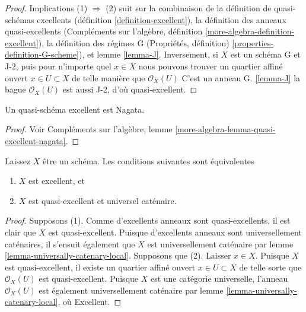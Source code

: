 \begin{proof}

Implications (1) $\Rightarrow$ (2) suit sur la combinaison de la définition de quasi-schémas excellents (définition \ref{definition-excellent}), la définition des anneaux quasi-excellents (Compléments sur l'algèbre, définition \ref{more-algebra-definition-excellent}), la définition des régimes G (Propriétés, définition) \ref{properties-definition-G-scheme}), et lemme \ref{lemma-J}. Inversement, si $X$ est un schéma G et J-2, puis pour n'importe quel $x \in X$
nous pouvons trouver un quartier affiné ouvert $x \in U \subset X$
de telle manière que $\mathcal{O}_X(U)$ C'est un anneau G. \ref{lemma-J}
la bague $\mathcal{O}_X(U)$ est aussi J-2, d'où quasi-excellent.

\end{proof}

\begin{lemma}

\label{lemma-quasi-excellent-nagata}
Un quasi-schéma excellent est Nagata.
\end{lemma}

\begin{proof}
Voir Compléments sur l'algèbre, lemme \ref{more-algebra-lemma-quasi-excellent-nagata}.
\end{proof}

\begin{lemma}

\label{lemma-characterize-excellent}
Laissez $X$ être un schéma. Les conditions suivantes sont équivalentes
\begin{enumerate}
\item $X$ est excellent, et
\item $X$ est quasi-excellent et universel caténaire.
\end{enumerate}

\end{lemma}

\begin{proof}
Supposons (1). Comme d'excellents anneaux sont quasi-excellents, il est clair que $X$ est quasi-excellent. Puisque d'excellents anneaux sont universellement caténaires, il s'ensuit également que $X$ est universellement caténaire par lemme \ref{lemma-universally-catenary-local}. Supposons que (2). Laisser $x \in X$. Puisque $X$ est quasi-excellent, il existe un quartier affiné ouvert $x \in U \subset X$ de telle sorte que $\mathcal{O}_X(U)$ est quasi-excellent. Puisque $X$ est une catégorie universelle, l'anneau $\mathcal{O}_X(U)$ est également universellement caténaire par lemme \ref{lemma-universally-catenary-local}, où Excellent.
\end{proof}


